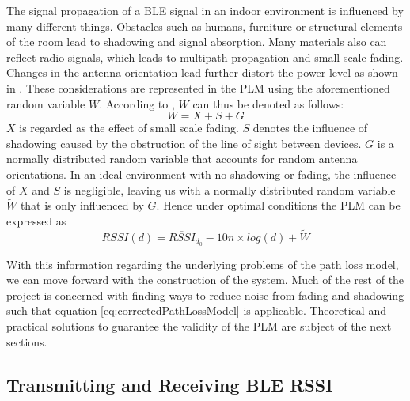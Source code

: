\documentclass[a4paper, oneside]{ipsreport}
\begin{document}
The signal propagation of a BLE signal in an indoor environment is influenced by many different things. Obstacles such as humans, furniture or structural elements of the room lead to shadowing and signal absorption. Many materials also can reflect radio signals, which leads to multipath propagation and small scale fading. Changes in the antenna orientation lead further distort the power level as shown in \autocite{AntennaOrientationRssi}. These considerations are represented in the PLM using the aforementioned random variable $W$. According to \autocite{AntennaDiversity}, $W$ can thus be denoted as follows:
\begin{equation} \label{eq:2}
	W = X + S + G
\end{equation}
$X$ is regarded as the effect of small scale fading. $S$ denotes the influence of shadowing caused by the obstruction of the line of sight between devices. $G$ is a normally distributed random variable that accounts for random antenna orientations. In an ideal environment with no shadowing or fading, the influence of $X$ and $S$ is negligible, leaving us with a normally distributed random variable $\tilde{W}$ that is only influenced by $G$. Hence under optimal conditions the PLM can be expressed as
\begin{equation} \label{eq:correctedPathLossModel}
	RSSI(d) = \overline{RSSI}_{d_0} - 10n \times log(d) + \tilde{W}
\end{equation}

With this information regarding the underlying problems of the path loss model, we can move forward with the construction of the system. Much of the rest of the project is concerned with finding ways to reduce noise from fading and shadowing such that equation \ref{eq:correctedPathLossModel} is applicable. Theoretical and practical solutions to guarantee the validity of the PLM are subject of the next sections.

\subsection{Transmitting and Receiving BLE RSSI}
\end{document}
